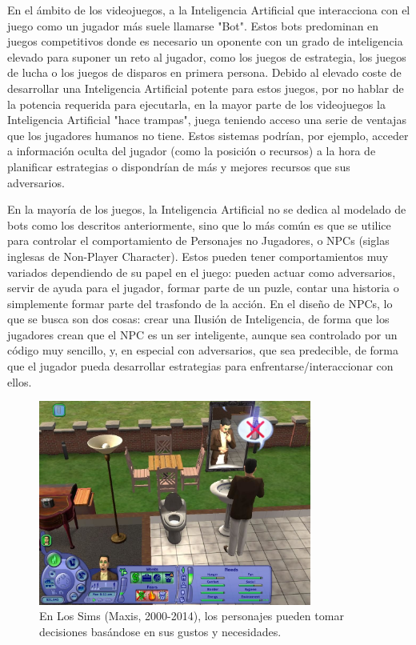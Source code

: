 En el ámbito de los videojuegos, a la Inteligencia Artificial que interacciona con el juego como un jugador más suele llamarse "Bot". Estos bots predominan en juegos competitivos donde es necesario un oponente con un grado de inteligencia elevado para suponer un reto al jugador, como los juegos de estrategia, los juegos de lucha o los juegos de disparos en primera persona. Debido al elevado coste de desarrollar una Inteligencia Artificial potente para estos juegos, por no hablar de la potencia requerida para ejecutarla, en la mayor parte de los videojuegos la Inteligencia Artificial "hace trampas", juega teniendo acceso una serie de ventajas que los jugadores humanos no tiene. Estos sistemas podrían, por ejemplo, acceder a información oculta del jugador (como la posición o recursos) a la hora de planificar estrategias o dispondrían de más y mejores recursos que sus adversarios. 

En la mayoría de los juegos, la Inteligencia Artificial no se dedica al modelado de bots como los descritos anteriormente, sino que lo más común es que se utilice para controlar el comportamiento de Personajes no Jugadores, o NPCs (siglas inglesas de Non-Player Character). Estos pueden tener comportamientos muy variados dependiendo de su papel en el juego: pueden actuar como adversarios, servir de ayuda para el jugador, formar parte de un puzle, contar una historia o simplemente formar parte del trasfondo de la acción. En el diseño de NPCs, lo que se busca son dos cosas: crear una Ilusión de Inteligencia, de forma que los jugadores crean que el NPC es un ser inteligente, aunque sea controlado por un código muy sencillo, y, en especial con adversarios, que sea predecible, de forma que el jugador pueda desarrollar estrategias para enfrentarse/interaccionar con ellos.

\begin{figure}[h]
	\includegraphics[width=0.8\textwidth]{images/estadodelarte/ai/sims-captura}
	\centering
	\caption{En Los Sims (Maxis, 2000-2014), los personajes pueden tomar decisiones basándose en sus gustos y necesidades.}
\end{figure}

